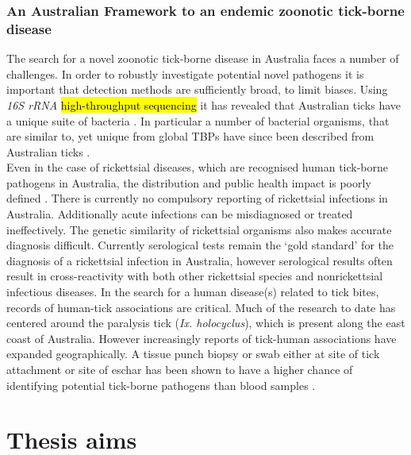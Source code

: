 \documentclass[a4paper, nobind]{templates/ociamthesis}
\begin{document}
\hypertarget{an-australian-framework-to-an-endemic-zoonotic-tick-borne-disease}{%
\subsection{An Australian Framework to an endemic zoonotic tick-borne disease}\label{an-australian-framework-to-an-endemic-zoonotic-tick-borne-disease}}

The search for a novel zoonotic tick-borne disease in Australia faces a number of challenges.
In order to robustly investigate potential novel pathogens it is important that detection methods are sufficiently broad, to limit biases.
Using \emph{16S rRNA} \hl{high-throughput sequencing} it has revealed that Australian ticks have a unique suite of bacteria \autocite{goftonBacterialProfilingReveals2015,goftonInhibitionEndosymbiontCandidatus2015}.
In particular a number of bacterial organisms, that are similar to, yet unique from global TBPs have since been described from Australian ticks \autocite{goftonPhylogeneticCharacterisationTwo2016,lohNovelBorreliaSpecies2016,goftonDetectionPhylogeneticCharacterisation2017,goftonNovelEhrlichiaSpecies2018}.\\
Even in the case of rickettsial diseases, which are recognised human tick-borne pathogens in Australia, the distribution and public health impact is poorly defined \autocite{stewartRickettsiaAustralisQueensland2017}.
There is currently no compulsory reporting of rickettsial infections in Australia.
Additionally acute infections can be misdiagnosed or treated ineffectively.
The genetic similarity of rickettsial organisms also makes accurate diagnosis difficult.
Currently serological tests remain the `gold standard' for the diagnosis of a rickettsial infection in Australia, however serological results often result in cross-reactivity with both other rickettsial species and nonrickettsial infectious diseases.
In the search for a human disease(s) related to tick bites, records of human-tick associations are critical.
Much of the research to date has centered around the paralysis tick (\emph{Ix. holocyclus}), which is present along the east coast of Australia.
However increasingly reports of tick-human associations have expanded geographically.
A tissue punch biopsy or swab either at site of tick attachment or site of eschar has been shown to have a higher chance of identifying potential tick-borne pathogens than blood samples \autocite{portilloGuidelinesDetectionRickettsia2017}.

\hypertarget{thesis-aims}{%
\chapter*{Thesis aims}\label{thesis-aims}}
\end{document}
